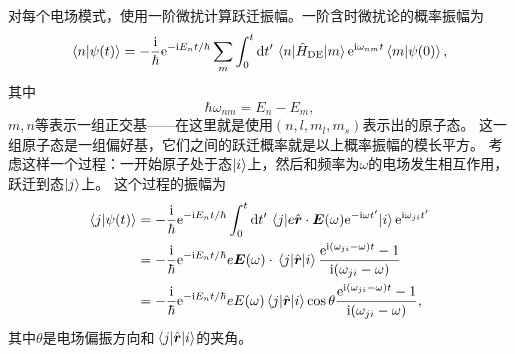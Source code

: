 \documentclass[UTF8, a4paper]{ctexart}
\newcommand*{\ee}{\mathrm{e}}
\newcommand*{\ii}{\mathrm{i}}
\begin{document}
对每个电场模式，使用一阶微扰计算跃迁振幅。一阶含时微扰论的概率振幅为
\[
    \braket{n}{\psi(t)} = - \frac{\ii}{\hbar} \ee^{- \ii E_n t / \hbar} \sum_m \int_0^t \dd{t'} \mel{n}{\hat{H}_\text{DE}}{m} \ee^{\ii \omega_{nm} t} \braket{m}{\psi(0)},
\]
其中
\[
    \hbar \omega_{nm} = E_n - E_m,
\]
$m, n$等表示一组正交基——在这里就是使用$(n, l, m_l, m_s)$表示出的原子态。
这一组原子态是一组偏好基，它们之间的跃迁概率就是以上概率振幅的模长平方。
考虑这样一个过程：一开始原子处于态$\ket{i}$上，然后和频率为$\omega$的电场发生相互作用，跃迁到态$\ket{j}$上。
这个过程的振幅为
\[
    \begin{aligned}
        \braket{j}{\psi(t)} &= - \frac{\ii}{\hbar} \ee^{- \ii E_n t / \hbar} \int_0^t \dd{t'} \mel{j}{e \hat{\vb*{r}} \cdot \vb*{E}(\omega) \ee^{- \ii \omega t'}}{i} \ee^{\ii \omega_{ji} t'} \\
        &= - \frac{\ii}{\hbar} \ee^{- \ii E_n t / \hbar} e \vb*{E}(\omega) \cdot \mel{j}{\hat{\vb*{r}}}{i} \frac{\ee^{\ii (\omega_{ji} - \omega) t} - 1}{\ii (\omega_{ji} - \omega)} \\
        &= - \frac{\ii}{\hbar} \ee^{- \ii E_n t / \hbar} e E(\omega) \mel{j}{\hat{\vb*{r}}}{i} \cos \theta \frac{\ee^{\ii (\omega_{ji} - \omega) t} - 1}{\ii (\omega_{ji} - \omega)},
    \end{aligned}
\]
其中$\theta$是电场偏振方向和$\mel{j}{\hat{\vb*{r}}}{i}$的夹角。
\end{document}
